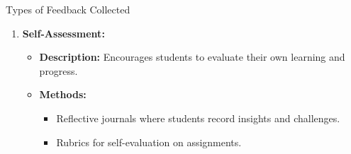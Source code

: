 \documentclass[aspectratio=169]{beamer}
\begin{document}
\begin{frame}[fragile]
\begin{block}{Types of Feedback Collected}
\begin{enumerate}
\begin{itemize}
\begin{itemize}
                    \end{itemize}
            \end{itemize}
            \item \textbf{Self-Assessment:}
            \begin{itemize}
                \item \textbf{Description:} Encourages students to evaluate their own learning and progress.
                \item \textbf{Methods:}
                    \begin{itemize}
                        \item Reflective journals where students record insights and challenges.
                        \item Rubrics for self-evaluation on assignments.
                    \end{itemize}
            \end{itemize}
        \end{enumerate}
    \end{block}
\end{frame}
\end{document}
